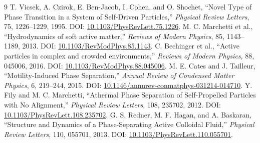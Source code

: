 \documentclass[11pt]{article}
\begin{document}
\begin{thebibliography}{9}
 T. Vicsek, A. Czirok, E. Ben-Jacob, I. Cohen, and O. Shochet, ``Novel Type of Phase Transition in a System of Self-Driven Particles,'' \emph{Physical Review Letters}, 75, 1226--1229, 1995. DOI: \href{https://doi.org/10.1103/PhysRevLett.75.1226}{10.1103/PhysRevLett.75.1226}.
 M. C. Marchetti et al., ``Hydrodynamics of soft active matter,'' \emph{Reviews of Modern Physics}, 85, 1143--1189, 2013. DOI: \href{https://doi.org/10.1103/RevModPhys.85.1143}{10.1103/RevModPhys.85.1143}.
 C. Bechinger et al., ``Active particles in complex and crowded environments,'' \emph{Reviews of Modern Physics}, 88, 045006, 2016. DOI: \href{https://doi.org/10.1103/RevModPhys.88.045006}{10.1103/RevModPhys.88.045006}.
 M. E. Cates and J. Tailleur, ``Motility-Induced Phase Separation,'' \emph{Annual Review of Condensed Matter Physics}, 6, 219--244, 2015. DOI: \href{https://doi.org/10.1146/annurev-conmatphys-031214-014710}{10.1146/annurev-conmatphys-031214-014710}.
 Y. Fily and M. C. Marchetti, ``Athermal Phase Separation of Self-Propelled Particles with No Alignment,'' \emph{Physical Review Letters}, 108, 235702, 2012. DOI: \href{https://doi.org/10.1103/PhysRevLett.108.235702}{10.1103/PhysRevLett.108.235702}.
 G. S. Redner, M. F. Hagan, and A. Baskaran, ``Structure and Dynamics of a Phase-Separating Active Colloidal Fluid,'' \emph{Physical Review Letters}, 110, 055701, 2013. DOI: \href{https://doi.org/10.1103/PhysRevLett.110.055701}{10.1103/PhysRevLett.110.055701}.
\end{thebibliography}
\end{document}
